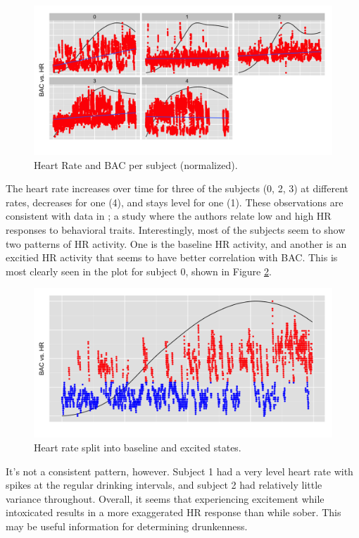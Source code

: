 \begin{figure}
	\includegraphics[width=1.0\textwidth]{../figs/heart_rates}
	\caption{Heart Rate and BAC per subject (normalized).}
	\label{fig:heart_rate_facet}
\end{figure}

The heart rate increases over time for three of the subjects (0, 2, 3) at different rates, decreases for one (4), and stays level for one (1). These observations are consistent with data in \cite{Assaad:2006}; a study where the authors relate low and high HR responses to behavioral traits. Interestingly, most of the subjects seem to show two patterns of HR activity. One is the baseline HR activity, and another is an excitied HR activity that seems to have better correlation with BAC. This is most clearly seen in the plot for subject 0, shown in Figure \ref{fig:heart_rate_split}. \begin{figure}
	\includegraphics[width=1.0\textwidth]{../figs/heart_rate_split}
	\caption{Heart rate split into baseline and excited states.}
	\label{fig:heart_rate_split}
\end{figure}It's not a consistent pattern, however. Subject 1 had a very level heart rate with spikes at the regular drinking intervals, and subject 2 had relatively little variance throughout. Overall, it seems that experiencing excitement while intoxicated results in a more exaggerated HR response than while sober. This may be useful information for determining drunkenness.

